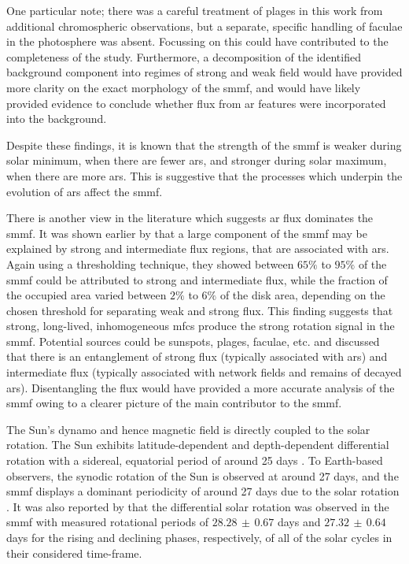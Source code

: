 One particular note; there was a careful treatment of plages in this work from additional chromospheric observations, but a separate, specific handling of faculae in the photosphere was absent. Focussing on this could have contributed to the completeness of the study. Furthermore, a decomposition of the identified background component into regimes of strong and weak field would have provided more clarity on the exact morphology of the \gls{smmf}, and would have likely provided evidence to conclude whether flux from \gls{ar} features were incorporated into the background.

Despite these findings, it is known that the strength of the \gls{smmf} is weaker during solar minimum, when there are fewer \glspl{ar}, and stronger during solar maximum, when there are more \glspl{ar}. This is suggestive that the processes which underpin the evolution of \glspl{ar} affect the \gls{smmf}.

There is another view in the literature which suggests \gls{ar} flux dominates the \gls{smmf}. It was shown earlier by \citet{kutsenko_contribution_2017} that a large component of the \gls{smmf} may be explained by strong and intermediate flux regions, that are associated with \glspl{ar}. Again using a thresholding technique, they showed between $65 \%$ to $95 \%$ of the \gls{smmf} could be attributed to strong and intermediate flux, while the fraction of the occupied area varied between $2 \%$ to $6 \%$ of the disk area, depending on the chosen threshold for separating weak and strong flux. This finding suggests that strong, long-lived, inhomogeneous \gls{mfc}s produce the strong rotation signal in the \gls{smmf}. Potential sources could be sunspots, plages, faculae, etc. and \citet{kutsenko_contribution_2017} discussed that there is an entanglement of strong flux (typically associated with \glspl{ar}) and intermediate flux (typically associated with network fields and remains of decayed \glspl{ar}). Disentangling the flux would have provided a more accurate analysis of the \gls{smmf} owing to a clearer picture of the main contributor to the \gls{smmf}.

The Sun's dynamo and hence magnetic field is directly coupled to the solar rotation. The Sun exhibits latitude-dependent and depth-dependent differential rotation with a sidereal, equatorial period of around 25 days \citep{howe_solar_2009}. To Earth-based observers, the synodic rotation of the Sun is observed at around 27 days, and the \gls{smmf} displays a dominant periodicity of around 27 days due to the solar rotation \citep{chaplin_studies_2003, xie_temporal_2017, bose_variability_2018}. It was also reported by \citet{xie_temporal_2017} that the differential solar rotation was observed in the \gls{smmf} with measured rotational periods of $28.28 \, \pm \, 0.67$ days and $27.32 \, \pm \, 0.64$ days for the rising and declining phases, respectively, of all of the solar cycles in their considered time-frame.

